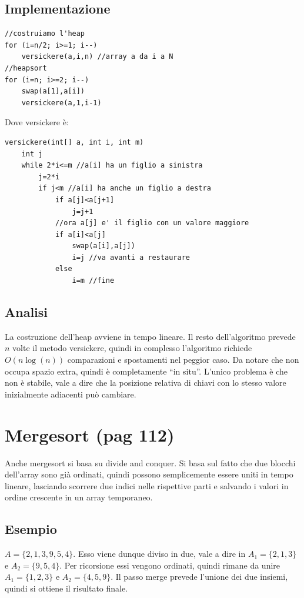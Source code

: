 \documentclass[a4paper]{book}
\newcommand{\lstIndent}{4}
\begin{document}
\subsection*{Implementazione}
\begin{lstlisting}[tabsize=\lstIndent]
//costruiamo l'heap
for (i=n/2; i>=1; i--)
	versickere(a,i,n) //array a da i a N
//heapsort	
for (i=n; i>=2; i--)
	swap(a[1],a[i])
	versickere(a,1,i-1)
\end{lstlisting}                                                                          
Dove versickere è:
\begin{lstlisting}[tabsize=\lstIndent]
versickere(int[] a, int i, int m)
	int j
	while 2*i<=m //a[i] ha un figlio a sinistra
		j=2*i
		if j<m //a[i] ha anche un figlio a destra
			if a[j]<a[j+1]
				j=j+1
			//ora a[j] e' il figlio con un valore maggiore
			if a[i]<a[j]
				swap(a[i],a[j])
				i=j //va avanti a restaurare
			else
				i=m //fine		
\end{lstlisting}                                                                                                 
\subsection*{Analisi}
La costruzione dell'heap avviene in tempo lineare. Il resto dell'algoritmo prevede $n$ volte il metodo versickere, quindi in complesso l'algoritmo richiede $O(n \log (n))$ comparazioni e spostamenti nel peggior caso. Da notare che non occupa spazio extra, quindi è completamente ``in situ''. L'unico problema è che non è stabile, vale a dire che la posizione relativa di chiavi con lo stesso valore inizialmente adiacenti può cambiare. 

\section{Mergesort (pag 112)}
Anche mergesort si basa su divide and conquer. Si basa sul fatto che due blocchi dell'array sono già ordinati, quindi possono semplicemente essere uniti in tempo lineare, lasciando scorrere due indici nelle rispettive parti e salvando i valori in ordine crescente in un array temporaneo.

\subsection*{Esempio}
$A=\{2, 1, 3, 9, 5, 4\}$. Esso viene dunque diviso in due, vale a dire in $A_1 =\{2,1,3\}$ e $A_2 =\{9,5,4\}$. Per ricorsione essi vengono ordinati, quindi rimane da unire $A_1 =\{1,2,3\}$ e $A_2 =\{4,5,9\}$. Il passo merge prevede l'unione dei due insiemi, quindi si ottiene il risultato finale.
\end{document}
